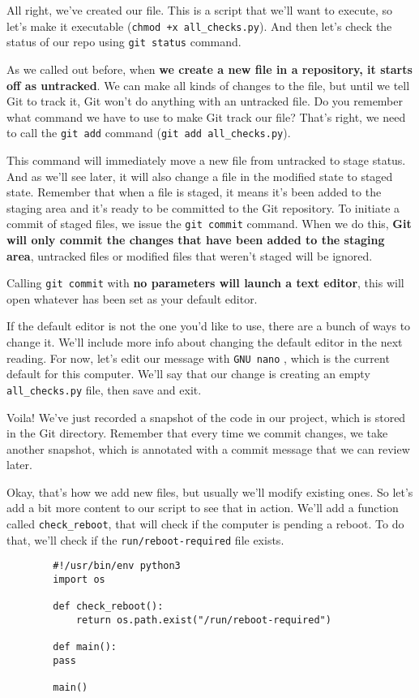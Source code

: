 	All right, we've created our file. This is a script that we'll want to execute, so let's make it executable (\verb|chmod +x all_checks.py|). And then let's check the status of our repo using \texttt{git status} command.
	
	As we called out before, when \textbf{we create a new file in a repository, it starts off as untracked}. We can make all kinds of changes to the file, but until we tell Git to track it, Git won't do anything with an untracked file. Do you remember what command we have to use to make Git track our file? That's right, we need to call the \texttt{git add} command (\verb|git add all_checks.py|).
	
	This command will immediately move a new file from untracked to stage status. And as we'll see later, it will also change a file in the modified state to staged state. Remember that when a file is staged, it means it's been added to the staging area and it's ready to be committed to the Git repository. 
	To initiate a commit of staged files, we issue the \verb|git commit| command. When we do this, \textbf{Git will only commit the changes that have been added to the staging area}, untracked files or modified files that weren't staged will be ignored.
	
	Calling \texttt{git commit} with \textbf{no parameters will launch a text editor}, this will open whatever has been set as your default editor.
	
	If the default editor is not the one you'd like to use, there are a bunch of ways to change it. We'll include more info about changing the default editor in the next reading. For now, let's edit our message with \texttt{GNU nano} , which is the current default for this computer. We'll say that our change is creating an empty \verb|all_checks.py| file, then save and exit.
	
	Voila! We've just recorded a snapshot of the code in our project, which is stored in the Git directory. Remember that every time we commit changes, we take another snapshot, which is annotated with a commit message that we can review later.
	
	Okay, that's how we add new files, but usually we'll modify existing ones. So let's add a bit more content to our script to see that in action. We'll add a function called \verb|check_reboot|, that will check if the computer is pending a reboot. To do that, we'll check if the \verb|run/reboot-required| file exists.
	
	\begin{verbatim}
		#!/usr/bin/env python3		
		import os
		
		def check_reboot():
			return os.path.exist("/run/reboot-required")
			
		def main():
		pass
		
		main()
	\end{verbatim}

